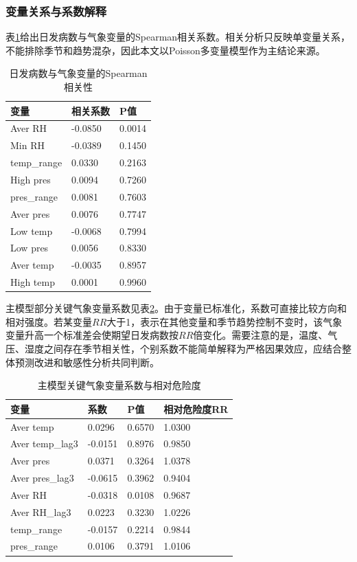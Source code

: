 \documentclass[UTF8,a4paper,12pt]{ctexart}
\begin{document}
\subsubsection{变量关系与系数解释}
表\ref{tab:corr}给出日发病数与气象变量的Spearman相关系数。相关分析只反映单变量关系，不能排除季节和趋势混杂，因此本文以Poisson多变量模型作为主结论来源。
\begin{table}[H]\centering\caption{日发病数与气象变量的Spearman相关性}\label{tab:corr}
\begin{tabular}{lll}
\toprule
变量 & 相关系数 & P值 \\
\midrule
Aver RH & -0.0850 & 0.0014 \\
Min RH & -0.0389 & 0.1450 \\
temp\_range & 0.0330 & 0.2163 \\
High pres & 0.0094 & 0.7260 \\
pres\_range & 0.0081 & 0.7603 \\
Aver pres & 0.0076 & 0.7747 \\
Low temp & -0.0068 & 0.7994 \\
Low pres & 0.0056 & 0.8330 \\
Aver temp & -0.0035 & 0.8957 \\
High temp & 0.0001 & 0.9960 \\
\bottomrule
\end{tabular}
\end{table}

主模型部分关键气象变量系数见表\ref{tab:coef}。由于变量已标准化，系数可直接比较方向和相对强度。若某变量$RR$大于1，表示在其他变量和季节趋势控制不变时，该气象变量升高一个标准差会使期望日发病数按$RR$倍变化。需要注意的是，温度、气压、湿度之间存在季节相关性，个别系数不能简单解释为严格因果效应，应结合整体预测改进和敏感性分析共同判断。
\begin{table}[H]\centering\caption{主模型关键气象变量系数与相对危险度}\label{tab:coef}
\begin{tabular}{llll}
\toprule
变量 & 系数 & P值 & 相对危险度RR \\
\midrule
Aver temp & 0.0296 & 0.6570 & 1.0300 \\
Aver temp\_lag3 & -0.0151 & 0.8976 & 0.9850 \\
Aver pres & 0.0371 & 0.3264 & 1.0378 \\
Aver pres\_lag3 & -0.0615 & 0.3962 & 0.9404 \\
Aver RH & -0.0318 & 0.0108 & 0.9687 \\
Aver RH\_lag3 & 0.0223 & 0.3230 & 1.0226 \\
temp\_range & -0.0157 & 0.2214 & 0.9844 \\
pres\_range & 0.0106 & 0.3791 & 1.0106 \\
\bottomrule
\end{tabular}
\end{table}
\end{document}
